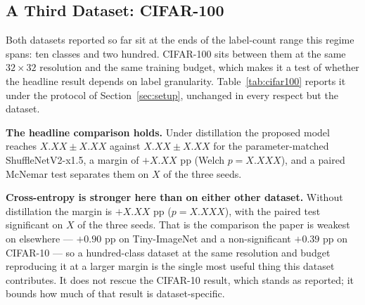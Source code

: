 %

\subsection{A Third Dataset: CIFAR-100}
\label{sec:cifar100}

Both datasets reported so far sit at the ends of the label-count range this
regime spans: ten classes and two hundred. CIFAR-100 sits between them at the
same $32\times32$ resolution and the same training budget, which makes it a
test of whether the headline result depends on label granularity.
Table~\ref{tab:cifar100} reports it under the protocol of
Section~\ref{sec:setup}, unchanged in every respect but the dataset.

\textbf{The headline comparison holds.} Under distillation the proposed model
reaches $X.XX \pm X.XX$ against $X.XX \pm X.XX$ for the
parameter-matched ShuffleNetV2-x1.5, a margin of $+X.XX$ pp (Welch
$p = X.XXX$), and a paired McNemar test separates them on $X$ of the three
seeds.

\textbf{Cross-entropy is stronger here than on either other dataset.} Without
distillation the margin is $+X.XX$ pp ($p = X.XXX$), with the paired test
significant on $X$ of the three seeds. That is the comparison the paper is
weakest on elsewhere --- $+0.90$ pp on Tiny-ImageNet and a non-significant
$+0.39$ pp on CIFAR-10 --- so a hundred-class dataset at the same resolution
and budget reproducing it at a larger margin is the single most useful thing
this dataset contributes. It does not rescue the CIFAR-10 result, which stands
as reported; it bounds how much of that result is dataset-specific.

